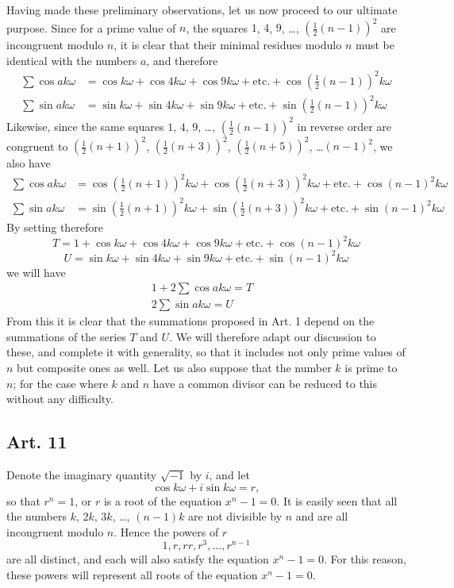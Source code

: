 \documentclass{book}
\theoremstyle{plain}
\theoremstyle{remark}
\begin{document}
Having made these preliminary observations, let us now proceed to our ultimate purpose.  Since for a prime value of $n$, the squares $1$, $4$, $9$, \dots, $(\tfrac{1}{2}(n-1))^2$ are incongruent modulo $n$, it is clear that their minimal residues modulo $n$ must be identical with the numbers $a$, and therefore
\begin{align*}
 \sum \cos ak\omega &= \cos k \omega + \cos 4k\omega + \cos 9k\omega + \textrm{etc.} + \cos (\tfrac{1}{2}(n-1))^2k\omega \\
  \sum \sin ak\omega &= \sin k \omega + \sin 4k\omega + \sin 9k\omega + \textrm{etc.} + \sin (\tfrac{1}{2}(n-1))^2k\omega 
  \end{align*}
Likewise, since the same squares $1$, $4$, $9$, \dots, $(\tfrac{1}{2}(n-1))^2$ in reverse order are congruent to $(\tfrac{1}{2}(n+1))^2$, $(\tfrac{1}{2}(n+3))^2$, $(\tfrac{1}{2}(n+5))^2$, \dots $(n-1)^2$, we also have 
\begin{align*}
 \sum \cos ak\omega &= \cos\left(\tfrac{1}{2}(n+1)\right)^2 k \omega + \cos \left(\tfrac{1}{2}(n+3)\right)^2k\omega + \textrm{etc.} + \cos (n-1)^2 k\omega \\
  \sum \sin ak\omega &= \sin \left(\tfrac{1}{2}(n+1)\right)^2 k \omega + \sin \left(\tfrac{1}{2}(n+3)\right)^2k\omega + \textrm{etc.} + \sin (n-1)^2k\omega 
  \end{align*}
  By setting therefore
\[ T = 1 + \cos k \omega + \cos 4k\omega + \cos 9k\omega + \textrm{etc.} + \cos (n-1)^2k\omega \]
\[ U =  \sin k \omega + \sin 4k\omega + \sin 9k\omega +\textrm{etc.} + \sin (n-1)^2k\omega \]
we will have
\begin{align*} 
1+2\sum \cos ak\omega = T& \\
2\sum\sin ak\omega = U & 
\end{align*} 
From this it is clear that the summations proposed in Art. 1 depend on the summations of the series $T$ and $U$.  We will therefore adapt our discussion to these, and complete it with generality, so that it includes not only prime values of $n$ but composite ones as well.   Let us also suppose that the number $k$ is prime to $n$; for the case where $k$ and $n$ have a common divisor can be reduced to this without any difficulty.

\subsection*{Art. 11}
Denote the imaginary quantity $\sqrt{-1}$ by $i$, and let 
\[ \cos k \omega + i \sin k \omega = r, \]
so that $r^n=1$, or $r$ is a root of the equation $x^n-1=0$.  It is easily seen that all the numbers $k$, $2k$, $3k$, \dots, $(n-1)k$ are not divisible by $n$ and are all incongruent modulo $n$.  Hence the powers of $r$
\[ 1, r, rr, r^3,\dots, r^{n-1} \]
are all distinct, and each will also satisfy the equation $x^n-1=0$.   For this reason, these powers will represent all roots of the equation $x^n-1=0$.  
\end{document}
